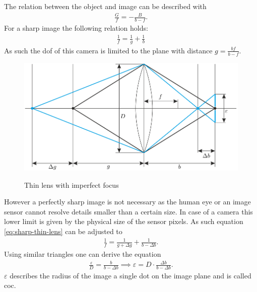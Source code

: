 The relation between the object and image can be described with
\begin{align}
    \frac{G}{f} = - \frac{B}{b-f}.
\end{align}
For a sharp image the following relation holds:
\begin{align}
    \frac{1}{f} = \frac{1}{g} + \frac{1}{b}
    \label{eq:sharp-thin-lens}
\end{align}
As such the \gls{dof} of this camera is limited to the plane with distance $g = \frac{bf}{b-f}$.
\begin{figure}[h]
    \centering
    \includegraphics[width=\textwidth]{images/coc.png}
    \caption{Thin lens with imperfect focus}
    \label{fig:coc-thin-lens}
    \cite{Beyerer.2016}
\end{figure}
However a perfectly sharp image is not necessary as the human eye or an image sensor cannot resolve details smaller than a certain size.
In case of a camera this lower limit is given by the physical size of the sensor pixels.
As such equation \ref{eq:sharp-thin-lens} can be adjusted to
\begin{align}
    \frac{1}{f} = \frac{1}{g + \Delta g} + \frac{1}{b - \Delta b}.
\end{align}
Using similar triangles one can derive the equation
\begin{align}
    \frac{\varepsilon}{D} = \frac{b}{b - \Delta b} \implies \varepsilon = D \cdot \frac{\Delta b}{b - \Delta b}.
    \label{eq:coc}
\end{align}
$\varepsilon$ describes the radius of the image a single dot on the image plane and is called \gls{coc}.

